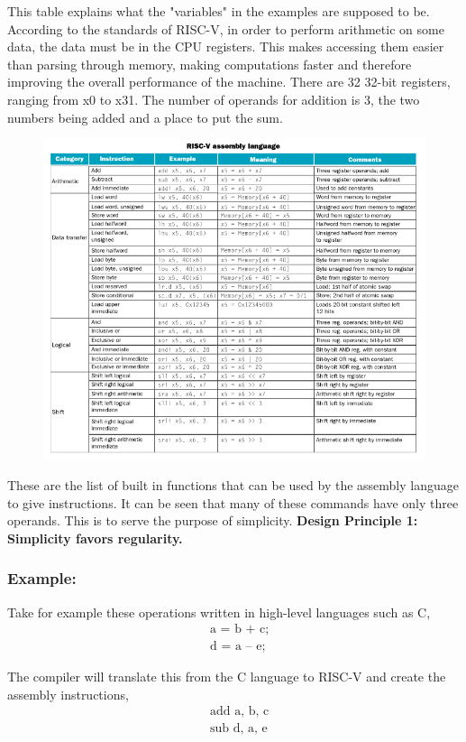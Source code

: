 \documentclass[12pt]{article}
\begin{document}
    \par This table explains what the "variables" in the examples are supposed
    to be. According to the standards of RISC-V, in order to perform arithmetic
    on some data, the data must be in the CPU registers. This makes accessing
    them easier than parsing through memory, making computations faster and
    therefore improving the overall performance of the machine. There are 32
    32-bit registers, ranging from x0 to x31. The number of operands for
    addition is 3, the two numbers being added and a place to put the sum.
    \newpage
    \begin{figure}[h]
        \centering
        \includegraphics[width=1\textwidth]{RISC-V commands.png}
    \end{figure}
    \par These are the list of built in functions that can be used by the
    assembly language to give instructions. It can be seen that many of these
    commands have only three operands. This is to serve the purpose of
    simplicity. \textbf{Design Principle 1: Simplicity favors regularity.}
    \subsubsection*{Example:}
    \par Take for example these operations written in high-level languages such
    as C,
    \begin{align*}
        & \text{a = b + c;} \\
        & \text{d = a -- e;}
    \end{align*}
    \par The compiler will translate this from the C language to RISC-V and
    create the assembly instructions,
    \begin{align*}
        & \text{add a, b, c} \\
        & \text{sub d, a, e}
    \end{align*}
\end{document}
